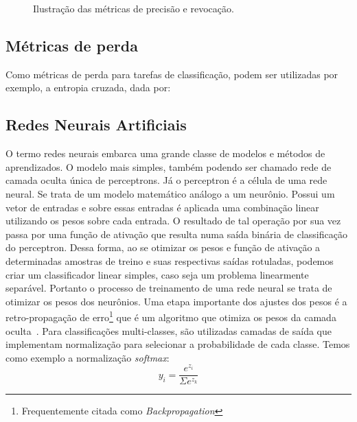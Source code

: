\begin{figure}[!ht]
\begin{minipage}{0.5\textwidth}
    \end{minipage}       
    \caption{Ilustração das métricas de precisão e revocação.}
    \label{fig:precisão_revocação}
\end{figure}




\subsection{Métricas de perda}\label{sec:cap2_metricas_desempenho}

Como métricas de perda para tarefas de classificação, podem ser utilizadas por exemplo, a entropia cruzada, dada por:




\subsection{Redes Neurais Artificiais}\label{sec:Cap2_redes_neurais}

O termo redes neurais embarca uma grande classe de modelos e métodos de aprendizados. O modelo mais simples, também podendo ser chamado rede de camada oculta única de perceptrons. Já o  perceptron é a célula de uma rede neural. Se trata de um modelo matemático análogo a um neurônio. Possui um vetor de entradas e sobre essas entradas é aplicada uma combinação linear utilizando os pesos sobre cada entrada. O resultado de tal operação por sua vez passa por uma função de ativação que resulta numa saída binária de classificação do perceptron. Dessa forma, ao se otimizar os pesos e função de ativação a determinadas amostras de treino e suas respectivas saídas rotuladas, podemos criar um classificador linear simples, caso seja um problema linearmente separável. Portanto o processo de treinamento de uma rede neural se trata de otimizar os pesos dos neurônios. 
Uma etapa importante dos ajustes dos pesos é a retro-propagação de erro\footnote{Frequentemente citada como \textit{Backpropagation}} que é um algoritmo que otimiza os pesos da camada oculta~\cite{hastie01statisticallearning}. Para classificações multi-classes, são utilizadas camadas de saída que implementam normalização para selecionar a probabilidade de cada classe.
Temos como exemplo a normalização \textit{softmax}: 
\begin{equation}
y_i=\frac{e^{z_i}} {\Sigma e^{z_k}}
\end{equation}


